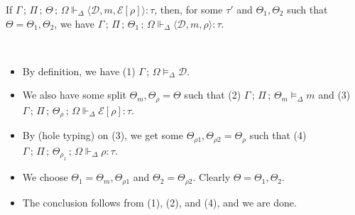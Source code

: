 \documentclass{article}
\newcommand{\mc}[1]{\mathcal{#1}}
\newcommand{\semi}{\,;\,}
\newcommand{\trip}[3]{\langle #1, #2, #3 \rangle}
\newcommand{\rtp}{\tau}
\newcommand{\tdef}[3]{#1 \semi #2 \vDash_\Delta #3}
\newcommand{\tmeml}[4]{#1 \semi #2 \semi #3 \vDash_\Delta #4}
\newcommand{\trhop}[6]{#1 \semi #2 \semi #3 \semi #4 \Vdash_\Delta #5: #6}
\newcommand{\tcfgl}[8]{#1 \semi #2 \semi #3 \semi #4 \Vdash_\Delta \trip{#5}{#6}{#7} : #8}
\newcommand{\D}{\mc{D}}
\newcommand{\E}{\mc{E}}
\begin{document}
\begin{lemma}
\label{thm:lholecfg}
If $\tcfgl{\Gamma}{\Pi}{\Theta}{\Omega}{\D}{m}{\E[\rho]}{\rtp}$,
then, for some $\rtp'$ and $\Theta_1,\Theta_2$
such that $\Theta=\Theta_1,\Theta_2$,
we have $\tcfgl{\Gamma}{\Pi}{\Theta_1}{\Omega}{\D}{m}{\rho}{\rtp}$.

\begin{Proof}\
\begin{itemize}
\item By definition, we have (1) $\tdef{\Gamma}{\Omega}{\D}$.
\item We also have some split $\Theta_m,\Theta_\rho=\Theta$ such that
(2) $\tmeml{\Gamma}{\Pi}{\Theta_m}{m}$ and 
(3) $\trhop{\Gamma}{\Pi}{\Theta_\rho}{\Omega}{\E[\rho]}{\rtp}$.
\item By  (hole typing) on (3),
we get some $\Theta_{\rho1},\Theta_{\rho2}=\Theta_\rho$
such that (4) $\trhop{\Gamma}{\Pi}{\Theta_{\rho_1}}{\Omega}{\rho}{\rtp}$.
\item We choose $\Theta_1=\Theta_m,\Theta_{\rho1}$ and $\Theta_2=\Theta_{\rho2}$.
Clearly $\Theta=\Theta_1,\Theta_2$.
\item The conclusion follows from (1), (2), and (4), and we are done.
\end{itemize}
\end{Proof}
\end{lemma}
\end{document}
